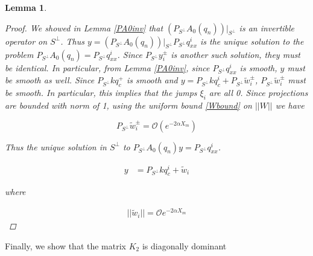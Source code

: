 \documentclass[12pt]{article}
\newtheorem{lemma}{Lemma}
\begin{document}
\begin{lemma}
\begin{proof}
We showed in Lemma \ref{PA0inv} that $(P_{S^\perp} A_0(q_n))|_{S^\perp}$ is an invertible operator on $S^\perp$. Thus $y = (P_{S^\perp} A_0(q_n))|_{S^\perp} P_{S^\perp} q^i_{xx}$ is the unique solution to the problem $P_{S^\perp} A_0(q_n) = P_{S^\perp} q^i_{xx}$. Since $P_{S^\perp} y_i^\pm$ is another such solution, they must be identical. In particular, from Lemma \ref{PA0inv}, since $P_{S^\perp} q^i_{xx}$ is smooth, $y$ must be smooth as well. Since $P_{S^\perp} k q^+_c$ is smooth and $y = P_{S^\perp} k q^i_c + P_{S^\perp} \tilde{w}_i^\pm$, $P_{S^\perp} \tilde{w}_i^\pm$ must be smooth. In particular, this implies that the jumps $\xi_i$ are all 0. Since projections are bounded with norm of 1, using the uniform bound \eqref{Wbound} on $||W||$ we have 

\[
P_{S^\perp} \tilde{w}_i^\pm = \mathcal{O}(e^{-2 \alpha X_m})
\]

Thus the unique solution in $S^\perp$ to $P_{S^\perp} A_0(q_n) y = P_{S^\perp} q^i_{xx}$.

\begin{align*}
y &= P_{S^\perp} k q^i_c + \tilde{w}_i
\end{align*}

where

\begin{align*}
||\tilde{w}_i|| = \mathcal{O}e^{-2 \alpha X_m}
\end{align*}

\end{proof}
\end{lemma}

Finally, we show that the matrix $K_2$ is diagonally dominant

\end{document}
